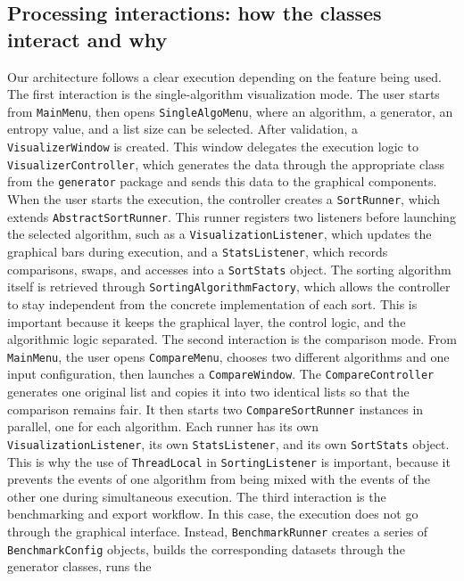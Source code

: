 \documentclass{article}
\begin{document}
\subsection{Processing interactions: how the classes interact and why}
Our architecture follows a clear execution depending on the feature being used. The
first interaction is the single-algorithm visualization mode. The user starts from \texttt{MainMenu}, then opens \texttt{SingleAlgoMenu}, where an algorithm, a 
generator, an entropy value, and a list size can be selected. After validation, a \texttt{VisualizerWindow} is created. This window delegates the execution logic to \texttt{VisualizerController}, which generates the data through the appropriate class
from the \texttt{generator} package and sends this data to the graphical 
components.
When the user starts the execution, the controller creates a \texttt{SortRunner}, 
which extends \texttt{AbstractSortRunner}. This runner registers two listeners 
before launching the selected algorithm, such as a \texttt{VisualizationListener}, 
which updates the graphical bars during execution, and a \texttt{StatsListener}, 
which records comparisons, swaps, and accesses into a \texttt{SortStats} object. 
The sorting algorithm itself is retrieved through \texttt{SortingAlgorithmFactory}, 
which allows the controller to stay independent from the concrete implementation 
of each sort. This is important because it keeps the graphical layer, the control 
logic, and the algorithmic logic separated.
The second interaction is the comparison mode. From \texttt{MainMenu}, the user 
opens \texttt{CompareMenu}, chooses two different algorithms and one input 
configuration, then launches a \texttt{CompareWindow}. The \texttt{CompareController} generates one original list and copies it into two 
identical lists so that the comparison remains fair. It then starts two \texttt{CompareSortRunner} instances in parallel, one for each algorithm. Each 
runner has its own \texttt{VisualizationListener}, its own \texttt{StatsListener}, and
its own \texttt{SortStats} object. This is why the use of \texttt{ThreadLocal} in \texttt{SortingListener} is important, because it prevents the events of one 
algorithm from being mixed with the events of the other one during simultaneous 
execution.
The third interaction is the benchmarking and export workflow. In this case, the 
execution does not go through the graphical interface. Instead, \texttt{BenchmarkRunner} creates a series of \texttt{BenchmarkConfig} objects, 
builds the corresponding datasets through the generator classes, runs the 
\end{document}
